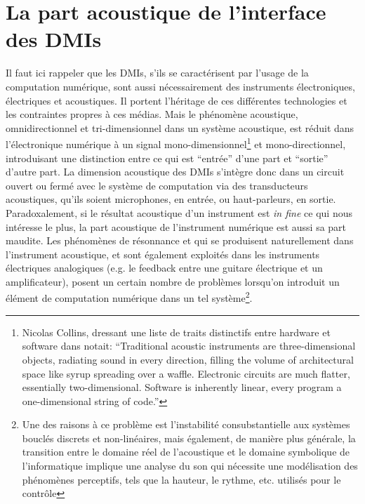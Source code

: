 \section{La part acoustique de l'interface des DMIs}
\label{sec:interfaces:part_acoustique}

\noindent Il faut ici rappeler que les \glspl{DMI}, s'ils se caractérisent par l'usage de la computation numérique, sont aussi nécessairement des instruments électroniques, électriques et acoustiques. Il portent l'héritage de ces différentes technologies et les contraintes propres à ces médias. Mais le phénomène acoustique, omnidirectionnel et tri-dimensionnel dans un système acoustique, est réduit dans l'électronique numérique à un signal mono-dimensionnel\footnote{Nicolas Collins, dressant une liste de traits distinctifs entre hardware et software dans \cite{collins_semiconducting_2013} notait: ``Traditional acoustic instruments are three-dimensional objects, radiating sound in every direction, filling the volume of architectural space like syrup spreading over a waffle. Electronic circuits are much flatter, essentially two-dimensional. Software is inherently linear, every program a one-dimensional string of code.''} et mono-directionnel, introduisant une distinction entre ce qui est ``entrée'' d'une part et ``sortie'' d'autre part. La dimension acoustique des \glspl{DMI} s'intègre donc dans un circuit ouvert ou fermé avec le système de computation via des transducteurs acoustiques, qu'ils soient microphones, en entrée, ou haut-parleurs, en sortie.\\
\indent Paradoxalement, si le résultat acoustique d'un instrument est \textit{in fine} ce qui nous intéresse le plus, la part acoustique de l'instrument numérique est aussi sa part maudite. Les phénomènes de résonnance et qui se produisent naturellement dans l'instrument acoustique, et sont également exploités dans les instruments électriques analogiques (e.g. le feedback entre une guitare électrique et un amplificateur), posent un certain nombre de problèmes lorsqu'on introduit un élément de computation numérique dans un tel système\footnote{Une des raisons à ce problème est l'instabilité consubstantielle aux systèmes bouclés discrets et non-linéaires, mais également, de manière plus générale, la transition entre le domaine réel de l'acoustique et le domaine symbolique de l'informatique implique une analyse du son qui nécessite une modélisation des phénomènes perceptifs, tels que la hauteur, le rythme, etc. utilisés pour le contrôle}.\\

